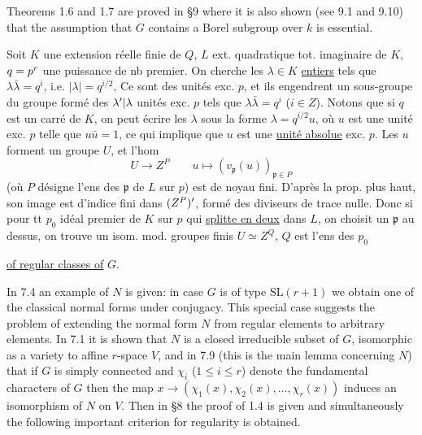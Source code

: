 Theorems 1.6 and 1.7 are proved in \S9 where it is also shown (see 9.1 and 9.10) that the assumption that $G$ contains a Borel subgroup over $k$ is essential.



Soit $K$ une extension   réelle finie de $Q$, $L$ ext. quadratique tot. imaginaire de $K$, $q=p^{{r}}$ une puissance de nb premier. On cherche les $\lambda\in K$ \uline{entiers} tels que $\lambda\bar\lambda=q^i$, i.e. $|\lambda|=q^{i/2}$,  Ce sont des unités exc. $p$, et ils engendrent  un sous-groupe du groupe  formé des ${\lambda'|\lambda}$ unités exc. $p$ tels que $\lambda\bar\lambda=q^i$ ($i\in Z$). Notons que  si $q$ est un carré de $K$, on peut écrire les $\lambda$ sous la forme $\lambda=q^{i/2}u$, où $u$ est une unité exc. $p$ telle que $u\bar u=1$, ce qui implique que $u$ est une \uline{unité absolue} exc. $p$. Les $u$ forment un groupe $U$, et l'hom
\[
U\longrightarrow Z^P\qquad u\longmapsto(v_{\mathfrak p}(u))_{\mathfrak p\in P}
\]
(où $P$ désigne l'ens des $\mathfrak p$ de $L$ sur $p$) est de noyau fini. D'après la prop. plus haut, son image est  d'indice fini dans $(Z^{{P}})'$,  formé des diviseurs de trace  nulle. Donc si pour tt $p_0$  idéal premier de $K$ sur $p$ qui \uline{splitte en deux} dans $L$, on choisit un $\mathfrak p$ au dessus, on trouve un isom. mod. groupes finis $U\simeq Z^Q$, $Q$ est l'ens des $p_0$



\uline{of regular classes of} $G$.

In 7.4 an example of $N$ is given: in case $G$ is of type $\mathrm{SL}(r+1)$ we obtain one of the classical normal forms under conjugacy. This special case suggests the problem of extending the normal form $N$ from regular elements to arbitrary elements. In 7.1 it is shown that $N$ is a closed irreducible subset of $G$, isomorphic as a variety to affine $r$-space $V$, and in 7.9 (this is the main lemma concerning $N$) that if $G$ is simply connected and $\chi_i$ ($1\leq i\leq r$) denote the fundamental characters of $G$ then the map $x\to(\chi_1(x),\chi_2(x),\ldots,\chi_r(x))$ induces an isomorphism of $N$ on $V$. Then in \S8 the proof of 1.4 is given and simultaneously the following important criterion for regularity is obtained.

